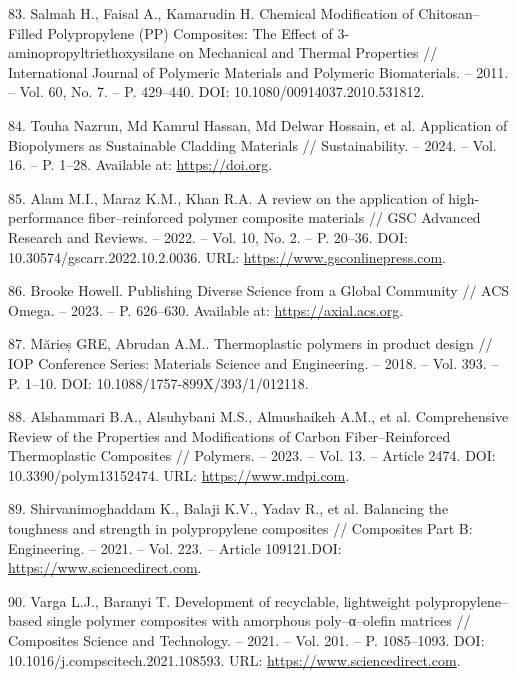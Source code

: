 \begin{references}
83. Salmah H., Faisal A., Kamarudin H. Chemical Modification of
Chitosan–Filled Polypropylene (PP) Composites: The Effect of
3-aminopropyltriethoxysilane on Mechanical and Thermal Properties //
Inter\-national Journal of Polymeric Materials and Polymeric
Biomaterials. – 2011. – Vol. 60, No. 7. – P. 429–440. DOI:
10.1080/00914037.2010.531812.

84. Touha Nazrun, Md Kamrul Hassan, Md Delwar Hossain, et
al. Application of Biopolymers as Sustainable Cladding Materials //
Sustainability. – 2024. – Vol. 16. – P. 1–28. Available
at: \href{https://doi.org/10.3390/su16010027}{https://doi.org}.

85. Alam M.I., Maraz K.M., Khan R.A. A review on the application of
high-performance fiber–reinforced polymer composite materials // GSC
Advanced Research and Reviews. – 2022. – Vol. 10, No. 2. –
P. 20–36. DOI:
10.30574/gscarr.2022.10.2.0036. URL: \href{https://www.gsconlinepress.com/journals/gscarr/sites/default/files/GSCARR-2022-0036.pdf}{https://www.gsconlinepress.com}.

86. Brooke Howell. Publishing Diverse Science from a Global Community
// ACS Omega. – 2023. – P. 626–630. Available
at: \href{https://axial.acs.org/cross-disciplinary-concepts/acs-omega-global}{https://axial.acs.org}.

87. Mărieș GRE, Abrudan A.M.. Thermoplastic polymers in product design
// IOP Conference Series: Materials Science and Engineering. – 2018. –
Vol. 393. – P. 1–10. DOI: 10.1088/1757-899X/393/1/012118.

88. Alshammari B.A., Alsuhybani M.S., Almushaikeh A.M., et
al. Comprehensive Review of the Properties and Modifications of Carbon
Fiber–Reinforced Thermoplastic Composites // Polymers. – 2023. –
Vol. 13. – Article 2474. DOI:
10.3390/polym13152474. URL: \href{https://www.mdpi.com/2073-4360/13/15/2474}{https://www.mdpi.com}.

89. Shirvanimoghaddam K., Balaji K.V., Yadav R., et al. Balancing the
toughness and strength in polyprop\-ylene composites // Composites Part
B: Engineering. – 2021. – Vol. 223. – Article
109121.DOI: \\\href{https://www.sciencedirect.com/science/article/abs/pii/S1359836821001219}{https://www.sciencedirect.com}.

90. Varga L.J., Baranyi T. Development of recyclable, lightweight
polypropylene–based single polymer composites with amorphous
poly–α–olefin matrices // Composites Science and Technology. – 2021. –
Vol. 201. – P. 1085–1093. DOI:
10.1016/j.compscitech.2021.108593. URL: \href{https://www.sciencedirect.com/science/article/abs/pii/S0266353821005931}{https://www.sciencedirect.com}.


\end{references}
